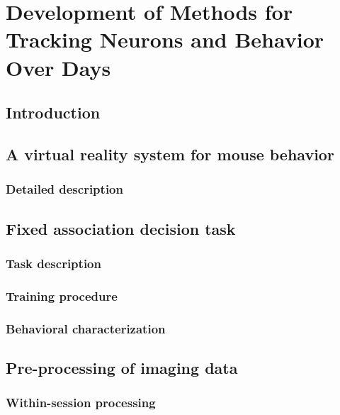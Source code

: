 \chapter{Development of Methods for Tracking Neurons and Behavior Over Days} \label{chapter_2}

\section{Introduction}

\section{A virtual reality system for mouse behavior} \label{sec:vr}

\subsection{Detailed description}

\section{Fixed association decision task} \label{sec:fixed_section}

\subsection{Task description} \label{sec:fixed_task}

\subsection{Training procedure} \label{sec:fixed_train}

\subsection{Behavioral characterization} \label{sec:fixed_behav}

\section{Pre-processing of imaging data} \label{methods:process_data}

\subsection{Within-session processing} \label{methods:within_session_process}

